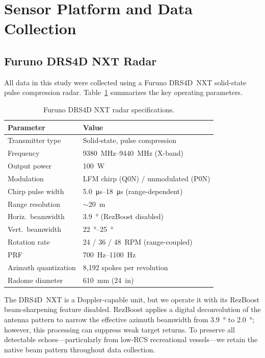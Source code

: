 \documentclass[conf]{new-aiaa}
\begin{document}
\section{Sensor Platform and Data Collection}
\label{sec:sensor}

\subsection{Furuno DRS4D NXT Radar}

All data in this study were collected using a Furuno DRS4D~NXT solid-state pulse compression radar. Table~\ref{tab:radar_specs} summarizes the key operating parameters.

\begin{table}[htb]
\centering
\caption{Furuno DRS4D NXT radar specifications.}
\label{tab:radar_specs}
\begin{tabular}{@{}ll@{}}
\toprule
\textbf{Parameter} & \textbf{Value} \\
\midrule
Transmitter type & Solid-state, pulse compression \\
Frequency & \SIrange{9380}{9440}{\mega\hertz} (X-band) \\
Output power & \SI{100}{\watt} \\
Modulation & LFM chirp (Q0N) / unmodulated (P0N) \\
Chirp pulse width & \SIrange{5.0}{18}{\micro\second} (range-dependent) \\
Range resolution & $\sim$\SI{20}{\meter} \\
Horiz.\ beamwidth & \SI{3.9}{\degree} (RezBoost disabled) \\
Vert.\ beamwidth & \SIrange{22}{25}{\degree} \\
Rotation rate & 24 / 36 / 48~RPM (range-coupled) \\
PRF & \SIrange{700}{1100}{\hertz} \\
Azimuth quantization & 8{,}192 spokes per revolution \\
Radome diameter & \SI{610}{\milli\meter} (24~in) \\
\bottomrule
\end{tabular}
\end{table}

The DRS4D~NXT is a Doppler-capable unit, but we operate it with its RezBoost beam-sharpening feature disabled. RezBoost applies a digital deconvolution of the antenna pattern to narrow the effective azimuth beamwidth from \SI{3.9}{\degree} to \SI{2.0}{\degree}; however, this processing can suppress weak target returns. To preserve all detectable echoes---particularly from low-RCS recreational vessels---we retain the native beam pattern throughout data collection.
\end{document}
